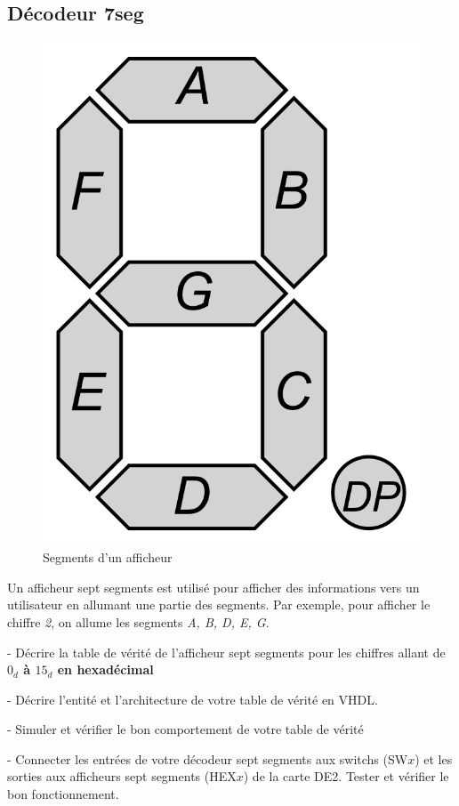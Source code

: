 \subsection{Décodeur 7seg}
\begin{figure}[ht]
    \centering
    \includegraphics[scale = 0.1]{img/SevenSegDisplay.png}
    \caption{Segments d'un afficheur}
\end{figure}

Un afficheur sept segments est utilisé pour afficher des informations vers un utilisateur en allumant une partie des segments. Par exemple, pour afficher le chiffre \textit{2}, on allume les segments \textit{A, B, D, E, G}.

\medskip

- Décrire la table de vérité de l'afficheur sept segments pour les chiffres allant de \textbf{$0_d$ à $15_d$ en hexadécimal}

\medskip

- Décrire l'entité et l'architecture de votre table de vérité en VHDL.

\medskip

- Simuler et vérifier le bon comportement de votre table de vérité

\medskip

- Connecter les entrées de votre décodeur sept segments aux switchs (SW$x$) et les sorties aux afficheurs sept segments (HEX$x$) de la carte DE2. Tester et vérifier le bon fonctionnement.
